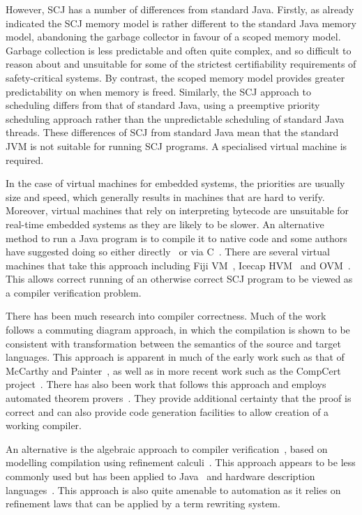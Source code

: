 \documentclass[a4paper,10pt]{report}
\begin{document}
However, SCJ has a number of differences from standard Java. Firstly, as already
indicated the SCJ memory model is rather different to the standard Java memory
model, abandoning the garbage collector in favour of a scoped memory model.
Garbage collection is less predictable and often quite complex, and so difficult
to reason about and unsuitable for some of the strictest certifiability
requirements of safety-critical systems.  By contrast, the scoped memory model
provides greater predictability on when memory is freed.  Similarly, the SCJ
approach to scheduling differs from that of standard Java, using a preemptive
priority scheduling approach rather than the unpredictable scheduling of
standard Java threads.  These differences of SCJ from standard Java mean that
the standard JVM is not suitable for running SCJ programs.  A specialised
virtual machine is required.

In the case of virtual machines for embedded systems, the priorities are usually
size and speed, which generally results in machines that are hard to verify.
Moreover, virtual machines that rely on interpreting bytecode are unsuitable for
real-time embedded systems as they are likely to be slower.  An alternative
method to run a Java program is to compile it to native code and some authors
have suggested doing so either directly~\cite{schultz2003} or via
C~\cite{varma2004}. There are several virtual machines that take this approach
including Fiji VM~\cite{pizlo2009}, Icecap HVM~\cite{sondergaard2012} and
OVM~\cite{armbruster2007}.  This allows correct running of an otherwise correct
SCJ program to be viewed as a compiler verification problem.

There has been much research into compiler correctness.  Much of the work
follows a commuting diagram approach, in which the compilation is shown to be
consistent with transformation between the semantics of the source and target
languages\cite{morris1973, thatcher1979}. This approach is apparent in much of
the early work such as that of McCarthy and Painter~\cite{mccarthy1967}, as well
as in more recent work such as the CompCert project~\cite{leroy2009a,
  leroy2009b}. There has also been work that follows this approach and employs
automated theorem provers~\cite{klein2006, milner1972, nipkow2000}. They provide
additional certainty that the proof is correct and can also provide code
generation facilities to allow creation of a working compiler.

An alternative is the algebraic approach to compiler
verification~\cite{hoare1991, sampaio1993}, based on modelling compilation using
refinement calculi~\cite{back1981, morgan1990, morris1987}. This approach
appears to be less commonly used but has been applied to Java~\cite{duran2005,
  duran2010} and hardware description languages~\cite{perna2010,
  perna2011}. This approach is also quite amenable to automation as it relies on
refinement laws that can be applied by a term rewriting system.
\end{document}
